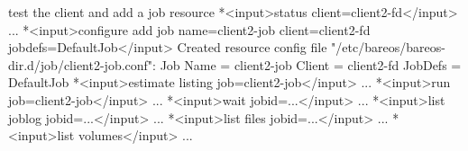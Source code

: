 \begin{bconsole}{test the client and add a job resource}
*<input>status client=client2-fd</input>
...
*<input>configure add job name=client2-job client=client2-fd jobdefs=DefaultJob</input>
Created resource config file "/etc/bareos/bareos-dir.d/job/client2-job.conf":
Job {
  Name = client2-job
  Client = client2-fd
  JobDefs = DefaultJob
}
*<input>estimate listing job=client2-job</input>
...
*<input>run job=client2-job</input>
...
*<input>wait jobid=...</input>
...
*<input>list joblog jobid=...</input>
...
*<input>list files jobid=...</input>
...
*<input>list volumes</input>
...
\end{bconsole}



% 
% 
% 
% 
% 
